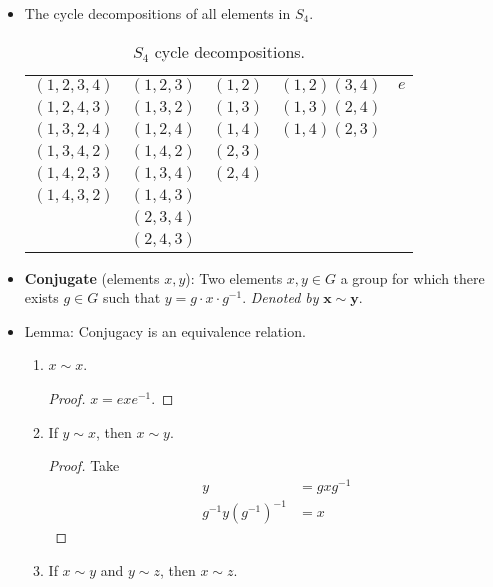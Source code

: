 \documentclass[../notes.tex]{subfiles}
\begin{document}
\begin{itemize}
\begin{itemize}
    \end{itemize}
    \item The cycle decompositions of all elements in $S_4$.
    \begin{table}[H]
        \centering
        \small
        \renewcommand{\arraystretch}{1.2}
        \begin{tabular}{|c|c|c|c|c|}
            $(1,2,3,4)$ & $(1,2,3)$ & $(1,2)$ & $(1,2)(3,4)$ & $e$\\
            $(1,2,4,3)$ & $(1,3,2)$ & $(1,3)$ & $(1,3)(2,4)$ &    \\
            $(1,3,2,4)$ & $(1,2,4)$ & $(1,4)$ & $(1,4)(2,3)$ &    \\
            $(1,3,4,2)$ & $(1,4,2)$ & $(2,3)$ &              &    \\
            $(1,4,2,3)$ & $(1,3,4)$ & $(2,4)$ &              &    \\
            $(1,4,3,2)$ & $(1,4,3)$ &         &              &    \\
                        & $(2,3,4)$ &         &              &    \\
                        & $(2,4,3)$ &         &              &    \\
        \end{tabular}
        \caption{$S_4$ cycle decompositions.}
        \label{tab:S4Cycles}
    \end{table}
    \item \textbf{Conjugate} (elements $x,y$): Two elements $x,y\in G$ a group for which there exists $g\in G$ such that $y=g\cdot x\cdot g^{-1}$. \emph{Denoted by} $\bm{x\sim y}$.
    \item Lemma: Conjugacy is an equivalence relation.
    \begin{enumerate}[label={(\Roman*)}]
        \item $x\sim x$.
        \begin{proof}
            $x=exe^{-1}$.
        \end{proof}
        \item If $y\sim x$, then $x\sim y$.
        \begin{proof}
            Take
            \begin{align*}
                y &= gxg^{-1}\\
                g^{-1}y(g^{-1})^{-1} &= x
            \end{align*}
        \end{proof}
        \item If $x\sim y$ and $y\sim z$, then $x\sim z$.

\end{enumerate}
\end{itemize}
\end{document}
